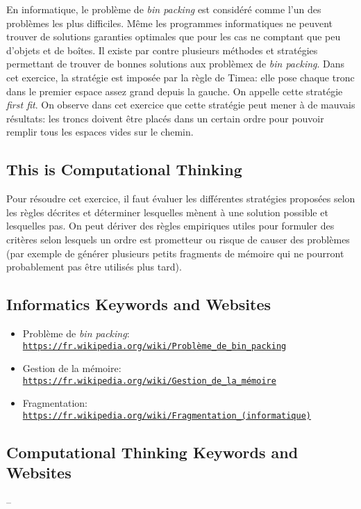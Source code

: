 \documentclass[a4paper,11pt]{report}
\newcommand{\BrochureUrlText}[1]{\texttt{#1}}
\begin{document}
En informatique, le problème de \emph{bin packing} est considéré comme l’un des problèmes les plus difficiles. Même les programmes informatiques ne peuvent trouver de solutions garanties optimales que pour les cas ne comptant que peu d’objets et de boîtes. Il existe par contre plusieurs méthodes et stratégies permettant de trouver de bonnes solutions aux problèmex de \emph{bin packing}. Dans cet exercice, la stratégie est imposée par la règle de Timea: elle pose chaque tronc dans le premier espace assez grand depuis la gauche. On appelle cette stratégie \emph{first fit}. On observe dans cet exercice que cette stratégie peut mener à de mauvais résultats: les troncs doivent être placés dans un certain ordre pour pouvoir remplir tous les espaces vides sur le chemin.


\subsection*{This is Computational Thinking}

Pour résoudre cet exercice, il faut évaluer les différentes stratégies proposées selon les règles décrites et déterminer lesquelles mènent à une solution possible et lesquelles pas. On peut dériver des règles empiriques utiles pour formuler des critères selon lesquels un ordre est prometteur ou risque de causer des problèmes (par exemple de générer plusieurs petits fragments de mémoire qui ne pourront probablement pas être utilisés plus tard).


\subsection*{Informatics Keywords and Websites}

\begin{itemize}
  \item Problème de \emph{bin packing}: \href{https://fr.wikipedia.org/wiki/Probl\%C3\%A8me_de_bin_packing}{\BrochureUrlText{https://fr.wikipedia.org/wiki/Problème\_de\_bin\_packing}}
  \item Gestion de la mémoire: \href{https://fr.wikipedia.org/wiki/Gestion_de_la_m\%C3\%A9moire}{\BrochureUrlText{https://fr.wikipedia.org/wiki/Gestion\_de\_la\_mémoire}}
  \item Fragmentation: \href{https://fr.wikipedia.org/wiki/Fragmentation_(informatique)}{\BrochureUrlText{https://fr.wikipedia.org/wiki/Fragmentation\_(informatique)}}
\end{itemize}


\subsection*{Computational Thinking Keywords and Websites}

–
\end{document}
